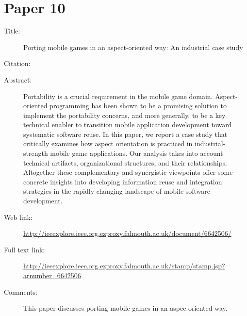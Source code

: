 \documentclass{scrartcl}
\begin{document}
\section*{Paper 10}
\begin{description}
\item[Title:] Porting mobile games in an aspect-oriented way: An industrial case study
\item[Citation:] \cite{6642506}
\item[Abstract:] Portability is a crucial requirement in the mobile game domain. Aspect-oriented programming has been shown to be a promising solution to implement the portability concerns, and more generally, to be a key technical enabler to transition mobile application development toward systematic software reuse. In this paper, we report a case study that critically examines how aspect orientation is practiced in industrial-strength mobile game applications. Our analysis takes into account technical artifacts, organizational structures, and their relationships. Altogether these complementary and synergistic viewpoints offer some concrete insights into developing information reuse and integration strategies in the rapidly changing landscape of mobile software development.
\item[Web link:] \url{http://ieeexplore.ieee.org.ezproxy.falmouth.ac.uk/document/6642506/}
\item[Full text link:] \url{http://ieeexplore.ieee.org.ezproxy.falmouth.ac.uk/stamp/stamp.jsp?arnumber=6642506}
\item[Comments:] This paper discusses porting mobile games in an aspec-oriented way. 
\end{description}



\end{document}
